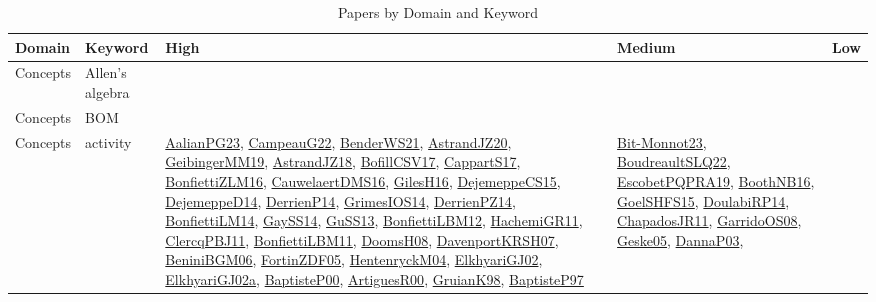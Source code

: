 {\scriptsize
\begin{longtable}{lp{3cm}>{\raggedright}p{6cm}>{\raggedright}p{6cm}p{8cm}}
\caption{Papers by Domain and Keyword}\\ \toprule
Domain & Keyword & High & Medium & Low\\ \midrule\endhead
\bottomrule
\endfoot
Concepts & Allen's algebra &  &  & \\
Concepts & BOM &  &  & \\
Concepts & activity & \href{papers/AalianPG23.pdf}{AalianPG23}\cite{AalianPG23}, \href{articles/CampeauG22.pdf}{CampeauG22}\cite{CampeauG22}, \href{papers/BenderWS21.pdf}{BenderWS21}\cite{BenderWS21}, \href{articles/AstrandJZ20.pdf}{AstrandJZ20}\cite{AstrandJZ20}, \href{papers/GeibingerMM19.pdf}{GeibingerMM19}\cite{GeibingerMM19}, \href{papers/AstrandJZ18.pdf}{AstrandJZ18}\cite{AstrandJZ18}, \href{papers/BofillCSV17.pdf}{BofillCSV17}\cite{BofillCSV17}, \href{papers/CappartS17.pdf}{CappartS17}\cite{CappartS17}, \href{papers/BonfiettiZLM16.pdf}{BonfiettiZLM16}\cite{BonfiettiZLM16}, \href{papers/CauwelaertDMS16.pdf}{CauwelaertDMS16}\cite{CauwelaertDMS16}, \href{papers/GilesH16.pdf}{GilesH16}\cite{GilesH16}, \href{papers/DejemeppeCS15.pdf}{DejemeppeCS15}\cite{DejemeppeCS15}, \href{papers/DejemeppeD14.pdf}{DejemeppeD14}\cite{DejemeppeD14}, \href{papers/DerrienP14.pdf}{DerrienP14}\cite{DerrienP14}, \href{articles/GrimesIOS14.pdf}{GrimesIOS14}\cite{GrimesIOS14}, \href{papers/DerrienPZ14.pdf}{DerrienPZ14}\cite{DerrienPZ14}, \href{papers/BonfiettiLM14.pdf}{BonfiettiLM14}\cite{BonfiettiLM14}, \href{papers/GaySS14.pdf}{GaySS14}\cite{GaySS14}, \href{papers/GuSS13.pdf}{GuSS13}\cite{GuSS13}, \href{papers/BonfiettiLBM12.pdf}{BonfiettiLBM12}\cite{BonfiettiLBM12}, \href{articles/HachemiGR11.pdf}{HachemiGR11}\cite{HachemiGR11}, \href{papers/ClercqPBJ11.pdf}{ClercqPBJ11}\cite{ClercqPBJ11}, \href{papers/BonfiettiLBM11.pdf}{BonfiettiLBM11}\cite{BonfiettiLBM11}, \href{papers/DoomsH08.pdf}{DoomsH08}\cite{DoomsH08}, \href{papers/DavenportKRSH07.pdf}{DavenportKRSH07}\cite{DavenportKRSH07}, \href{papers/BeniniBGM06.pdf}{BeniniBGM06}\cite{BeniniBGM06}, \href{papers/FortinZDF05.pdf}{FortinZDF05}\cite{FortinZDF05}, \href{papers/HentenryckM04.pdf}{HentenryckM04}\cite{HentenryckM04}, \href{papers/ElkhyariGJ02.pdf}{ElkhyariGJ02}\cite{ElkhyariGJ02}, \href{papers/ElkhyariGJ02a.pdf}{ElkhyariGJ02a}\cite{ElkhyariGJ02a}, \href{articles/BaptisteP00.pdf}{BaptisteP00}\cite{BaptisteP00}, \href{articles/ArtiguesR00.pdf}{ArtiguesR00}\cite{ArtiguesR00}, \href{papers/GruianK98.pdf}{GruianK98}\cite{GruianK98}, \href{papers/BaptisteP97.pdf}{BaptisteP97}\cite{BaptisteP97} & \href{papers/Bit-Monnot23.pdf}{Bit-Monnot23}\cite{Bit-Monnot23}, \href{papers/BoudreaultSLQ22.pdf}{BoudreaultSLQ22}\cite{BoudreaultSLQ22}, \href{articles/EscobetPQPRA19.pdf}{EscobetPQPRA19}\cite{EscobetPQPRA19}, \href{papers/BoothNB16.pdf}{BoothNB16}\cite{BoothNB16}, \href{articles/GoelSHFS15.pdf}{GoelSHFS15}\cite{GoelSHFS15}, \href{papers/DoulabiRP14.pdf}{DoulabiRP14}\cite{DoulabiRP14}, \href{papers/ChapadosJR11.pdf}{ChapadosJR11}\cite{ChapadosJR11}, \href{articles/GarridoOS08.pdf}{GarridoOS08}\cite{GarridoOS08}, \href{papers/Geske05.pdf}{Geske05}\cite{Geske05}, \href{papers/DannaP03.pdf}{DannaP03}\cite{DannaP03}, 
\end{longtable}}
